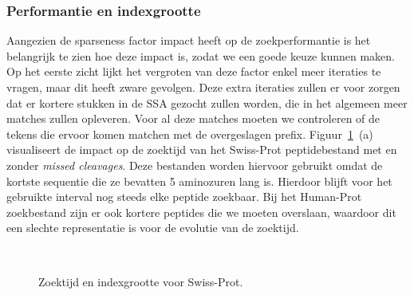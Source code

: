 \subsubsection{Performantie en indexgrootte}
Aangezien de sparseness factor impact heeft op de zoekperformantie is het belangrijk te zien hoe deze impact is, zodat we een goede keuze kunnen maken.
Op het eerste zicht lijkt het vergroten van deze factor enkel meer iteraties te vragen, maar dit heeft zware gevolgen.
Deze extra iteraties zullen er voor zorgen dat er kortere stukken in de SSA gezocht zullen worden, die in het algemeen meer matches zullen opleveren.
Voor al deze matches moeten we controleren of de tekens die ervoor komen matchen met de overgeslagen prefix.
Figuur~\ref{fig:search_sparseness}~(a) visualiseert de impact op de zoektijd van het Swiss-Prot peptidebestand met en zonder \textit{missed cleavages}.
Deze bestanden worden hiervoor gebruikt omdat de kortste sequentie die ze bevatten 5 aminozuren lang is.
Hierdoor blijft voor het gebruikte interval nog steeds elke peptide zoekbaar.
Bij het Human-Prot zoekbestand zijn er ook kortere peptides die we moeten overslaan, waardoor dit een slechte representatie is voor de evolutie van de zoektijd.
\\
\begin{figure}[H]
    \centering
    \\[4ex] %

    \caption{Zoektijd en indexgrootte voor Swiss-Prot.}\label{fig:search_sparseness}
\end{figure}

